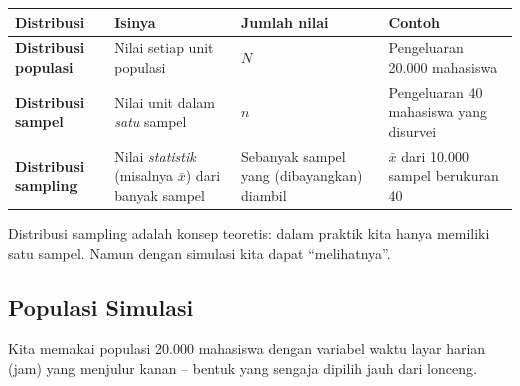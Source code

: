 \documentclass[
  indonesian,
  letterpaper,
]{book}
\newcounter{none} %
\begin{document}
{\def\LTcaptype{none} %
\begin{longtable}[]{@{}
  >{\raggedright\arraybackslash}p{}
  >{\raggedright\arraybackslash}p{}
  >{\centering\arraybackslash}p{}
  >{\raggedright\arraybackslash}p{}@{}}
\toprule\noalign{}
\begin{minipage}[b]{\linewidth}\raggedright
Distribusi
\end{minipage} & \begin{minipage}[b]{\linewidth}\raggedright
Isinya
\end{minipage} & \begin{minipage}[b]{\linewidth}\centering
Jumlah nilai
\end{minipage} & \begin{minipage}[b]{\linewidth}\raggedright
Contoh
\end{minipage} \\
\midrule\noalign{}
\endhead
\bottomrule\noalign{}
\endlastfoot
\textbf{Distribusi populasi} & Nilai setiap unit populasi & \(N\) &
Pengeluaran 20.000 mahasiswa \\
\textbf{Distribusi sampel} & Nilai unit dalam \emph{satu} sampel & \(n\)
& Pengeluaran 40 mahasiswa yang disurvei \\
\textbf{Distribusi sampling} & Nilai \emph{statistik} (misalnya
\(\bar{x}\)) dari banyak sampel & Sebanyak sampel yang (dibayangkan)
diambil & \(\bar{x}\) dari 10.000 sampel berukuran 40 \\
\end{longtable}
}

Distribusi sampling adalah konsep teoretis: dalam praktik kita hanya
memiliki satu sampel. Namun dengan simulasi kita dapat ``melihatnya''.

\subsection{Populasi Simulasi}\label{populasi-simulasi}

Kita memakai populasi 20.000 mahasiswa dengan variabel waktu layar
harian (jam) yang menjulur kanan -- bentuk yang sengaja dipilih jauh
dari lonceng.
\end{document}
